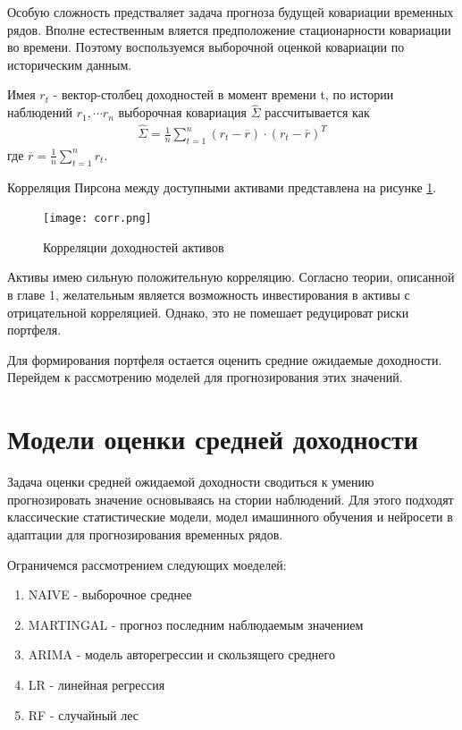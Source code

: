 Особую сложность предстваляет задача прогноза будущей ковариации временных рядов. 
Вполне естественным вляется предположение стационарности ковариации во времени. 
Поэтому воспользуемся выборочной оценкой ковариации по историческим данным.

Имея $r_t$ - вектор-столбец доходностей в момент времени t, по истории наблюдений $r_1, \cdots r_n$ 
выборочная ковариация $\hat{\Sigma}$ рассчитывается как 
\begin{align}
	\hat{\Sigma} = \frac{1}{n} \sum_{t=1}^{n}(r_t - \overline{r}) \cdot (r_t - \overline{r})^T
\end{align}
где $\overline{r} = \frac{1}{n} \sum_{t=1}^{n} r_t$.

Корреляция Пирсона между доступными активами представлена на рисунке \ref{fig:corr}.

\begin{figure}[H]
	\centering
	\texttt{[image: corr.png]}
	\caption{Корреляции доходностей активов}
	\label{fig:corr}
\end{figure}

Активы имею сильную положительную корреляцию. Согласно теории, описанной в главе 1, желательным является
возможность инвестирования в активы с отрицательной корреляцией. Однако, это не помешает редуцироват риски портфеля.

Для формирования портфеля остается оценить средние ожидаемые доходности. Перейдем к рассмотрению моделей для
прогнозирования этих значений.

\section{Модели оценки средней доходности}

Задача оценки средней ожидаемой доходности сводиться к умению прогнозировать значение основываясь на стории наблюдений.
Для этого подходят классические статистические модели, модел имашинного обучения и нейросети в адаптации для прогнозирования 
временных рядов.

Ограничемся рассмотрением следующих моеделей:
\begin{enumerate}
	\item NAIVE - выборочное среднее
	\item MARTINGAL - прогноз последним наблюдаемым значением 
	\item ARIMA - модель авторегрессии и скользящего среднего
	\item LR - линейная регрессия
	\item RF - случайный лес
\end{enumerate}

